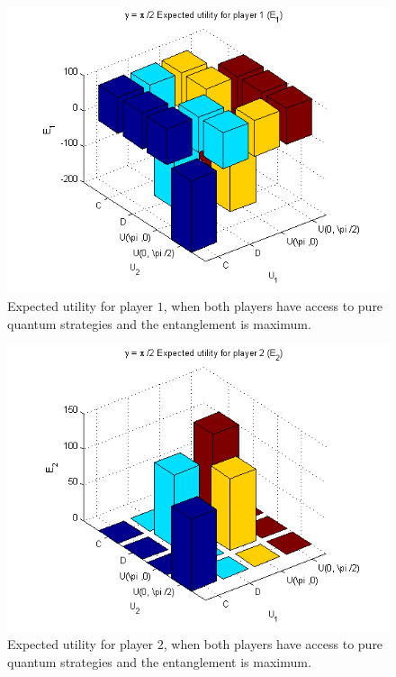 \begin{figure}[h!]
\centering 
\includegraphics[scale=0.60]{Figures/1.5qubit/p2_E1.png}
\caption{Expected utility for player $1$, when both players have access to pure quantum strategies and the entanglement is maximum. }
\label{fig:pg_2players_99_0_1:1}
\end{figure}

\begin{figure}[h!]
\centering 
\includegraphics[scale=0.60]{Figures/1.5qubit/P2_E2.png}
\caption{Expected utility for player $2$, when both players have access to pure quantum strategies and the entanglement is maximum. }
\label{fig:pg_2players_99_0_1:2}
\end{figure}



